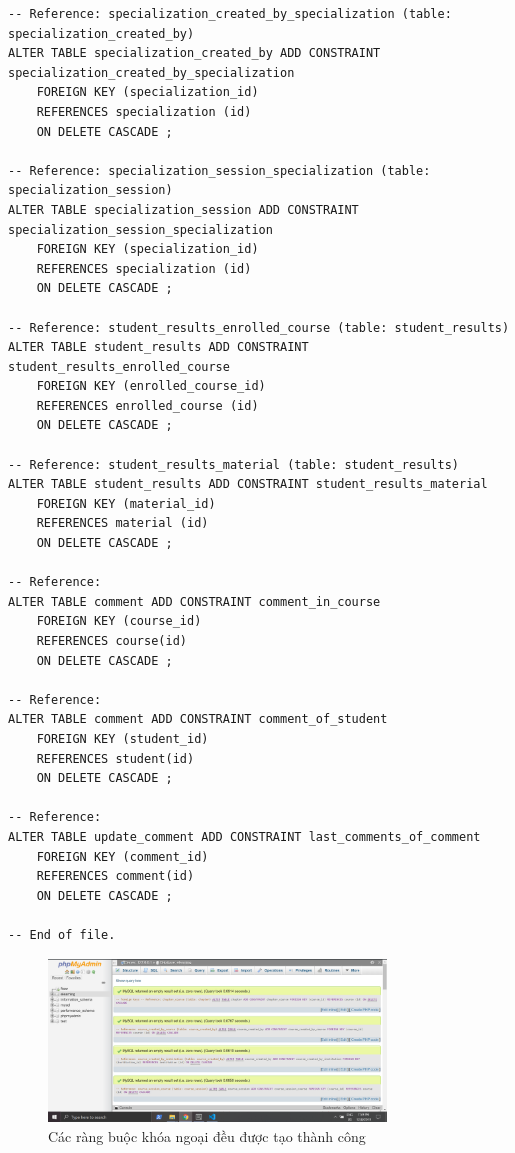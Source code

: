 \documentclass[12pt,a4paper,titlepage]{article}
\begin{document}
\begin{lstlisting}
-- Reference: specialization_created_by_specialization (table: specialization_created_by)
ALTER TABLE specialization_created_by ADD CONSTRAINT specialization_created_by_specialization
    FOREIGN KEY (specialization_id)
    REFERENCES specialization (id)  
    ON DELETE CASCADE ;

-- Reference: specialization_session_specialization (table: specialization_session)
ALTER TABLE specialization_session ADD CONSTRAINT specialization_session_specialization
    FOREIGN KEY (specialization_id)
    REFERENCES specialization (id)  
    ON DELETE CASCADE ;

-- Reference: student_results_enrolled_course (table: student_results)
ALTER TABLE student_results ADD CONSTRAINT student_results_enrolled_course
    FOREIGN KEY (enrolled_course_id)
    REFERENCES enrolled_course (id)  
    ON DELETE CASCADE ;

-- Reference: student_results_material (table: student_results)
ALTER TABLE student_results ADD CONSTRAINT student_results_material
    FOREIGN KEY (material_id)
    REFERENCES material (id)  
    ON DELETE CASCADE ;

-- Reference:
ALTER TABLE comment ADD CONSTRAINT comment_in_course
    FOREIGN KEY (course_id)
    REFERENCES course(id)
    ON DELETE CASCADE ;

-- Reference:
ALTER TABLE comment ADD CONSTRAINT comment_of_student
    FOREIGN KEY (student_id)
    REFERENCES student(id)
    ON DELETE CASCADE ;

-- Reference:
ALTER TABLE update_comment ADD CONSTRAINT last_comments_of_comment
    FOREIGN KEY (comment_id)
    REFERENCES comment(id)
    ON DELETE CASCADE ;

-- End of file.
\end{lstlisting}
\begin{figure}[h!]
	\centering
	\caption{Các ràng buộc khóa ngoại đều được tạo thành công}
	\includegraphics[width=0.8\textwidth]{images/fk.png}
\end{figure}
\end{document}
